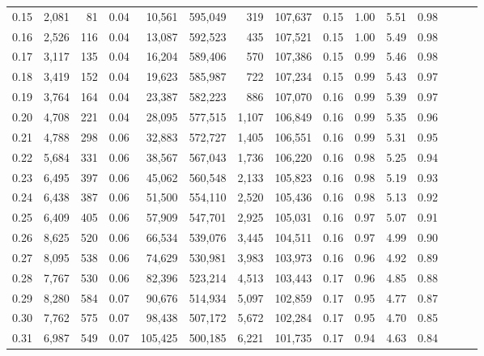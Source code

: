 \begin{tabular}{rrrrrrrrrrrrrrr}
0.15 &   2,081 &     81 &  0.04 &   10,561 &  595,049 &      319 &  107,637 &  0.15 &  1.00 &  5.51 &      0.98 \\
0.16 &   2,526 &    116 &  0.04 &   13,087 &  592,523 &      435 &  107,521 &  0.15 &  1.00 &  5.49 &      0.98 \\
0.17 &   3,117 &    135 &  0.04 &   16,204 &  589,406 &      570 &  107,386 &  0.15 &  0.99 &  5.46 &      0.98 \\
0.18 &   3,419 &    152 &  0.04 &   19,623 &  585,987 &      722 &  107,234 &  0.15 &  0.99 &  5.43 &      0.97 \\
0.19 &   3,764 &    164 &  0.04 &   23,387 &  582,223 &      886 &  107,070 &  0.16 &  0.99 &  5.39 &      0.97 \\
0.20 &   4,708 &    221 &  0.04 &   28,095 &  577,515 &    1,107 &  106,849 &  0.16 &  0.99 &  5.35 &      0.96 \\
0.21 &   4,788 &    298 &  0.06 &   32,883 &  572,727 &    1,405 &  106,551 &  0.16 &  0.99 &  5.31 &      0.95 \\
0.22 &   5,684 &    331 &  0.06 &   38,567 &  567,043 &    1,736 &  106,220 &  0.16 &  0.98 &  5.25 &      0.94 \\
0.23 &   6,495 &    397 &  0.06 &   45,062 &  560,548 &    2,133 &  105,823 &  0.16 &  0.98 &  5.19 &      0.93 \\
0.24 &   6,438 &    387 &  0.06 &   51,500 &  554,110 &    2,520 &  105,436 &  0.16 &  0.98 &  5.13 &      0.92 \\
0.25 &   6,409 &    405 &  0.06 &   57,909 &  547,701 &    2,925 &  105,031 &  0.16 &  0.97 &  5.07 &      0.91 \\
0.26 &   8,625 &    520 &  0.06 &   66,534 &  539,076 &    3,445 &  104,511 &  0.16 &  0.97 &  4.99 &      0.90 \\
0.27 &   8,095 &    538 &  0.06 &   74,629 &  530,981 &    3,983 &  103,973 &  0.16 &  0.96 &  4.92 &      0.89 \\
0.28 &   7,767 &    530 &  0.06 &   82,396 &  523,214 &    4,513 &  103,443 &  0.17 &  0.96 &  4.85 &      0.88 \\
0.29 &   8,280 &    584 &  0.07 &   90,676 &  514,934 &    5,097 &  102,859 &  0.17 &  0.95 &  4.77 &      0.87 \\
0.30 &   7,762 &    575 &  0.07 &   98,438 &  507,172 &    5,672 &  102,284 &  0.17 &  0.95 &  4.70 &      0.85 \\
0.31 &   6,987 &    549 &  0.07 &  105,425 &  500,185 &    6,221 &  101,735 &  0.17 &  0.94 &  4.63 &      0.84 \\

\end{tabular}
